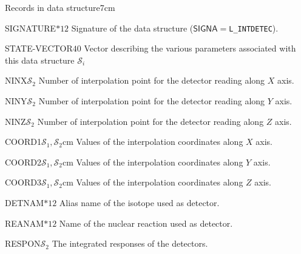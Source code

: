 \begin{DescriptionEnregistrement}{Records in  data structure}{7cm} 

\CharEnr
{SIGNATURE}{$*12$}
{Signature of the  data structure ($\mathsf{SIGNA}=${\tt L\_INTDETEC}).}

\IntEnr
{STATE-VECTOR}{$40$}
{Vector describing the various parameters associated with this data structure $\mathcal{S}_i$}

\IntEnr
{NINX}{$\mathcal{S}_2$}
{Number of interpolation point for the detector reading along $X$ axis.}

\IntEnr
{NINY}{$\mathcal{S}_2$}
{Number of interpolation point for the detector reading along $Y$ axis.}

\IntEnr
{NINZ}{$\mathcal{S}_2$}
{Number of interpolation point for the detector reading along $Z$ axis.}

\RealEnr
{COORD1}{$\mathcal{S}_1,\mathcal{S}_2$}{cm}
{Values of the interpolation coordinates along $X$ axis.}

\RealEnr
{COORD2}{$\mathcal{S}_1,\mathcal{S}_2$}{cm}
{Values of the interpolation coordinates along $Y$ axis.}

\RealEnr
{COORD3}{$\mathcal{S}_1,\mathcal{S}_2$}{cm}
{Values of the interpolation coordinates along $Z$ axis.}

\CharEnr
{DETNAM}{$*12$}
{Alias name of the isotope used as detector.}

\CharEnr
{REANAM}{$*12$}
{Name of the nuclear reaction used as detector.}

\RealEnr
{RESPON}{$\mathcal{S}_2$}{}
{The integrated responses of the detectors.}

\end{DescriptionEnregistrement}
\clearpage
